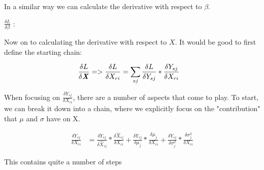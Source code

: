 \vspace{1cm}
In a similar way we can calculate the derivative with respect to $\beta$.

{\Large $\frac{\delta L}{\delta \beta}$ }:

\vspace{1cm}
Now on to calculating the derivative with respect to $X$. It would be good to first define the starting chain:

\begin{align}
    \frac{\delta L}{\delta \textbf{\emph{X}}}
    &=> \frac{\delta L}{\delta X_{ri}}
    = \sum_{sj} \frac{\delta L}{\delta Y_{sj}} * \frac{\delta Y_{sj}}{\delta X_{ri}}
\end{align}

When focusing on $\frac{\delta Y_{sj}}{\delta X_{ri}}$, there are a number of aspects that come to play. 
To start, we can break it down into a chain, where we explicitly focus on the "contribution"
that $\mu$ and $\sigma$ have on X.

\begin{align}
    \frac{\delta Y_{sj}}{\delta X_{ri}} &= 
        \frac{\delta Y_{sj}}{\delta \hat{X}_{sj}} * \frac{\delta \hat{X}_{sj}}{\delta X_{ri}}
            + \frac{\delta Y_{sj}}{\delta \mu_j} * \frac{\delta \mu_j}{\delta X_{ri}}
            + \frac{\delta Y_{sj}}{\delta \sigma^2_j} * \frac{\delta \sigma^2_j}{\delta X_{ri}}
\end{align}

This contains quite a number of steps